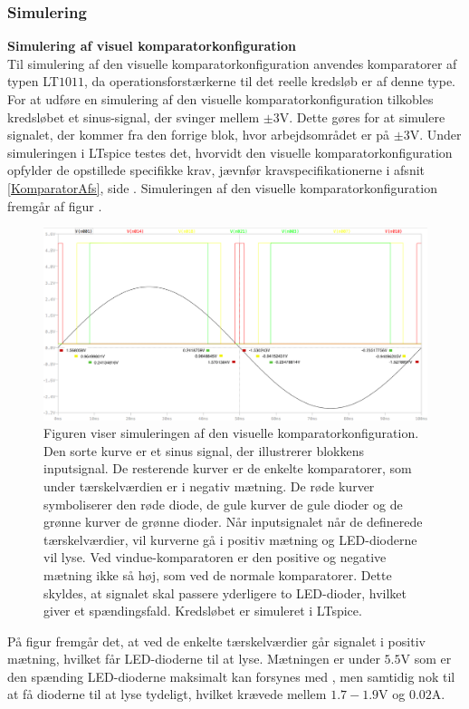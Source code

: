 \subsubsection{Simulering}
\noindent\textbf{Simulering af visuel komparatorkonfiguration} \\
Til simulering af den visuelle komparatorkonfiguration anvendes komparatorer af typen LT$1011$, da operationsforstærkerne til det reelle kredsløb er af denne type. For at udføre en simulering af den visuelle komparatorkonfiguration tilkobles kredsløbet et sinus-signal, der svinger mellem $\pm3$V. Dette gøres for at simulere signalet, der kommer fra den forrige blok, hvor arbejdsområdet er på $\pm3$V. Under simuleringen i LTspice testes det, hvorvidt den visuelle komparatorkonfiguration opfylder de opstillede specifikke krav, jævnfør kravspecifikationerne i afsnit \ref{KomparatorAfs}, side \pageref{KomparatorAfs}. Simuleringen af den visuelle komparatorkonfiguration fremgår af figur . 
\begin{figure}[H]
	\centering
	\includegraphics[scale=0.3]{figures/cProblemloesning/komparator_visuel_simulering_samlet1.PNG}
	\caption{Figuren viser simuleringen af den visuelle komparatorkonfiguration. Den sorte kurve er et sinus signal, der illustrerer blokkens inputsignal. De resterende kurver er de enkelte komparatorer, som under tærskelværdien er i negativ mætning. De røde kurver symboliserer den røde diode, de gule kurver de gule dioder og de grønne kurver de grønne dioder. Når inputsignalet når de definerede tærskelværdier, vil kurverne gå i positiv mætning og LED-dioderne vil lyse. Ved vindue-komparatoren er den positive og negative mætning ikke så høj, som ved de normale komparatorer. Dette skyldes, at signalet skal passere yderligere to LED-dioder, hvilket giver et spændingsfald. Kredsløbet er simuleret i LTspice.}
	\label{fig:komparator_visuel_simulering_samlet}
\end{figure}
På figur  fremgår det, at ved de enkelte tærskelværdier går signalet i positiv mætning, hvilket får LED-dioderne til at lyse. Mætningen er under $5.5$V som er den spænding LED-dioderne maksimalt kan forsynes med  , men samtidig nok til at få dioderne til at lyse tydeligt, hvilket krævede mellem $1.7-1.9$V og $0.02$A. 

